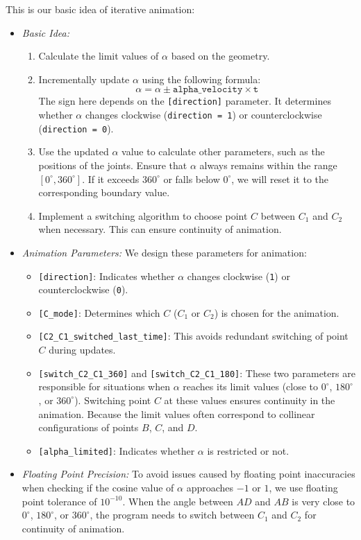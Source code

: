 \documentclass{article}
\begin{document}
 This is our basic idea of iterative animation:
 \begin{itemize}
	 \item \textit{Basic Idea:}
	 \begin{enumerate}
		 \item Calculate the limit values of $\alpha$ based on the geometry.
		 \item Incrementally update $\alpha$ using the following formula:
		 \[
		 \alpha = \alpha \pm \texttt{alpha\_velocity} \times \texttt{t}
		 \]
		 The sign here depends on the \texttt{[direction]} parameter. It determines whether $\alpha$ changes clockwise (\texttt{direction = 1}) or counterclockwise (\texttt{direction = 0}).
		 \item Use the updated $\alpha$ value to calculate other parameters, such as the positions of the joints. Ensure that $\alpha$ always remains within the range $[0^\circ, 360^\circ]$. If it exceeds $360^\circ$ or falls below $0^\circ$, we will reset it to the corresponding boundary value.
		 \item Implement a switching algorithm to choose point $C$ between $C_1$ and $C_2$ when necessary. This can ensure continuity of animation.
	 \end{enumerate}

	 \item \textit{Animation Parameters:}
	 We design these parameters for animation:
	 \begin{itemize}
		 \item \texttt{[direction]}: Indicates whether $\alpha$ changes clockwise (\texttt{1}) or counterclockwise (\texttt{0}).
		 \item \texttt{[C\_mode]}: Determines which $C$ ($C_1$ or $C_2$) is chosen for the animation.
		 \item \texttt{[C2\_C1\_switched\_last\_time]}: This avoids redundant switching of point $C$ during updates.
		 \item \texttt{[switch\_C2\_C1\_360]} and \texttt{[switch\_C2\_C1\_180]}: These two parameters are responsible for situations when $\alpha$ reaches its limit values (close to $0^\circ$, $180^\circ$, or $360^\circ$). Switching point $C$ at these values ensures continuity in the animation. Because the limit values often correspond to collinear configurations of points $B$, $C$, and $D$.
		 \item \texttt{[alpha\_limited]}: Indicates whether $\alpha$ is restricted or not.
	 \end{itemize}

	 \item \textit{Floating Point Precision:}
	 To avoid issues caused by floating point inaccuracies when checking if the cosine value of $\alpha$ approaches $-1$ or $1$, we use floating point tolerance of $10^{-10}$.
	 When the angle between $AD$ and $AB$ is very close to $0^\circ$, $180^\circ$, or $360^\circ$, the program needs to switch between $C_1$ and $C_2$ for continuity of animation.
 \end{itemize}
\end{document}
